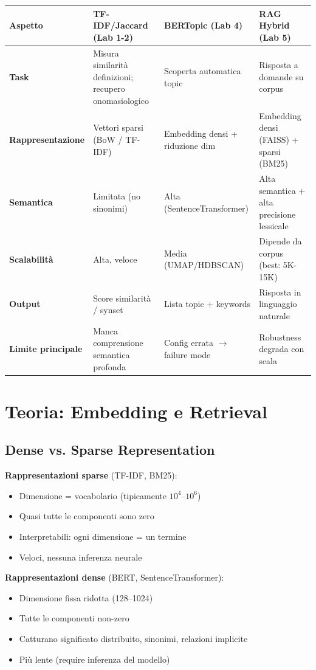 \documentclass[12pt,a4paper]{article}
\begin{document}
\begin{center}
\begin{tabular}{L{3.6cm}L{3.7cm}L{3.7cm}L{3.7cm}}
\toprule
\textbf{Aspetto} & \textbf{TF-IDF/Jaccard (Lab 1-2)} & \textbf{BERTopic (Lab 4)} & \textbf{RAG Hybrid (Lab 5)} \\
\midrule
\textbf{Task} & Misura similarit\`a definizioni; recupero onomasiologico & Scoperta automatica topic & Risposta a domande su corpus \\
\midrule
\textbf{Rappresentazione} & Vettori sparsi (BoW / TF-IDF) & Embedding densi + riduzione dim & Embedding densi (FAISS) + sparsi (BM25) \\
\midrule
\textbf{Semantica} & Limitata (no sinonimi) & Alta (SentenceTransformer) & Alta semantica + alta precisione lessicale \\
\midrule
\textbf{Scalabilit\`a} & Alta, veloce & Media (UMAP/HDBSCAN) & Dipende da corpus (best: 5K-15K) \\
\midrule
\textbf{Output} & Score similarit\`a / synset & Lista topic + keywords & Risposta in linguaggio naturale \\
\midrule
\textbf{Limite principale} & Manca comprensione semantica profonda & Config errata $\to$ failure mode & Robustness degrada con scala \\
\bottomrule
\end{tabular}
\end{center}

\section{Teoria: Embedding e Retrieval}

\subsection{Dense vs. Sparse Representation}

\begin{defbox}
\textbf{Rappresentazioni sparse} (TF-IDF, BM25):
\begin{itemize}
  \item Dimensione = vocabolario (tipicamente $10^4$--$10^6$)
  \item Quasi tutte le componenti sono zero
  \item Interpretabili: ogni dimensione = un termine
  \item Veloci, nessuna inferenza neurale
\end{itemize}

\textbf{Rappresentazioni dense} (BERT, SentenceTransformer):
\begin{itemize}
  \item Dimensione fissa ridotta (128--1024)
  \item Tutte le componenti non-zero
  \item Catturano significato distribuito, sinonimi, relazioni implicite
  \item Pi\`u lente (require inferenza del modello)
\end{itemize}
\end{defbox}
\end{document}
